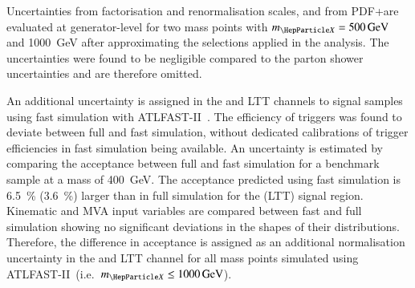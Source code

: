 Uncertainties from factorisation and renormalisation scales, and from
PDF+\alphas are evaluated at generator-level for two mass points with
$\mX = \SI{500}{\GeV}$ and \SI{1000}{\GeV} after approximating the
selections applied in the analysis. The uncertainties were found to be
negligible compared to the parton shower uncertainties and are
therefore omitted.

An additional uncertainty is assigned in the \hadhad and \lephad LTT
channels to signal samples using fast simulation with
\textsc{ATLFAST-II}~\cite{SOFT-2010-01}. The efficiency of \tauhadvis
triggers was found to deviate between full and fast simulation,
without dedicated calibrations of \tauhadvis trigger efficiencies in
fast simulation being available. An uncertainty is estimated by
comparing the acceptance between full and fast simulation for a
benchmark sample at a mass of \SI{400}{\GeV}. The acceptance predicted
using fast simulation is \SI{6.5}{\percent} (\SI{3.6}{\percent})
larger than in full simulation for the \hadhad (\lephad LTT) signal
region. Kinematic and MVA input variables are compared between fast
and full simulation showing no significant deviations in the shapes of
their distributions. Therefore, the difference in acceptance is
assigned as an additional normalisation uncertainty in the \hadhad and
\lephad LTT channel for all mass points simulated using
\textsc{ATLFAST-II}~(i.e.\ $\mX \leq \SI{1000}{\GeV}$).

